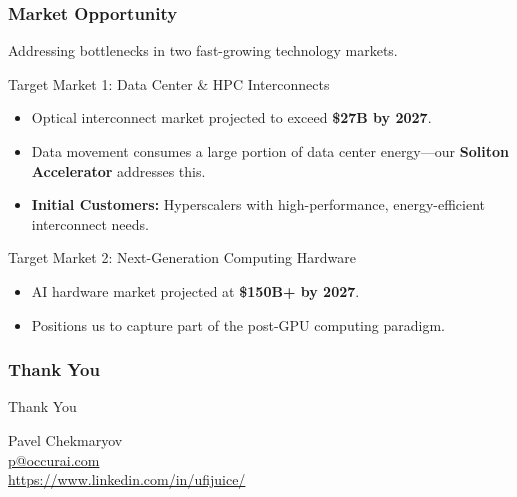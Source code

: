 \documentclass{beamer}
\begin{document}
\begin{frame}
    \frametitle{Market Opportunity}
    Addressing bottlenecks in two fast-growing technology markets.

    \begin{block}{Target Market 1: Data Center \& HPC Interconnects}
        \begin{itemize}
            \item Optical interconnect market projected to exceed \textbf{\$27B by 2027}.
            \item Data movement consumes a large portion of data center energy—our \textbf{Soliton Accelerator} addresses this.
            \item \textbf{Initial Customers:} Hyperscalers with high-performance, energy-efficient interconnect needs.
        \end{itemize}
    \end{block}

    \begin{block}{Target Market 2: Next-Generation Computing Hardware}
        \begin{itemize}
            \item AI hardware market projected at \textbf{\$150B+ by 2027}.
            \item Positions us to capture part of the post-GPU computing paradigm.
        \end{itemize}
    \end{block}
\end{frame}

\begin{frame}
    \frametitle{Thank You}
    \begin{center}
        \Huge Thank You
        \vspace{1cm}

        \Large Pavel Chekmaryov \\
        \normalsize \href{mailto:p@occurai.com}{p@occurai.com} \\
        \normalsize \url{https://www.linkedin.com/in/ufijuice/}
    \end{center}
\end{frame}
\end{document}
